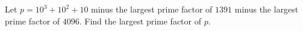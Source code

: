 Let $p=10^3+10^2+10$ minus the largest prime factor of $1391$ minus the largest prime factor of $4096$. Find the largest prime factor of $p$.

